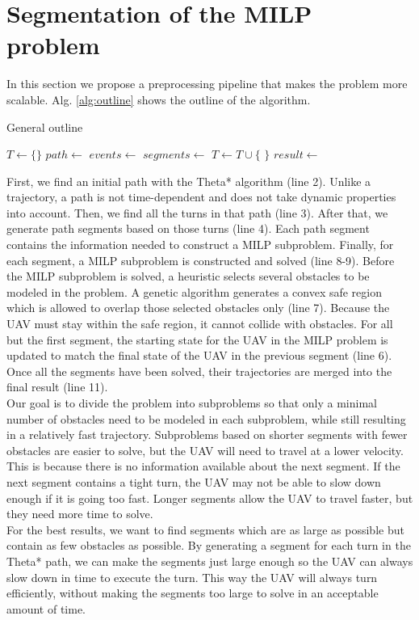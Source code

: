 \section{Segmentation of the MILP problem}
\label{section:segment}
In this section we propose a preprocessing pipeline that makes the problem more scalable. Alg. \ref{alg:outline} shows the outline of the algorithm.
\begin{algorithm}
\caption{General outline}
\label{alg:outline}
\begin{algorithmic}[1]
\State $T \leftarrow \{\}$ 
\State $path \leftarrow$ 
\State $events \leftarrow$ 
\State $segments \leftarrow$ 
\State {}
\State {}
\State {}
\State $T \leftarrow T \cup \{$  $\}$
\EndFor
\State $result \leftarrow $
\end{algorithmic}
\end{algorithm}

First, we find an initial path with the Theta* algorithm (line 2). Unlike a trajectory, a path is not time-dependent and does not take dynamic properties into account. Then, we find all the turns in that path (line 3). After that, we generate path segments based on those turns (line 4). Each path segment contains the information needed to construct a MILP subproblem. Finally, for each segment, a MILP subproblem is constructed and solved (line 8-9). Before the MILP subproblem is solved, a heuristic selects several obstacles to be modeled in the problem. A genetic algorithm generates a convex safe region which is allowed to overlap those selected obstacles only (line 7). Because the UAV must stay within the safe region, it cannot collide with obstacles. For all but the first segment, the starting state for the UAV in the MILP problem is updated to match the final state of the UAV in the previous segment (line 6). Once all the segments have been solved, their trajectories are merged into the final result (line 11).\\
Our goal is to divide the problem into subproblems so that only a minimal number of obstacles need to be modeled in each subproblem, while still resulting in a relatively fast trajectory. Subproblems based on shorter segments with fewer obstacles are easier to solve, but the UAV will need to travel at a lower velocity. This is because there is no information available about the next segment. 
If the next segment contains a tight turn, the UAV may not be able to slow down enough if it is going too fast. Longer segments allow the UAV to travel faster, but they need more time to solve.\\
For the best results, we want to find segments which are as large as possible but contain as few obstacles as possible. By generating a segment for each turn in the Theta* path, we can make the segments just large enough so the UAV can always slow down in time to execute the turn. This way the UAV will always turn efficiently, without making the segments too large to solve in an acceptable amount of time.
